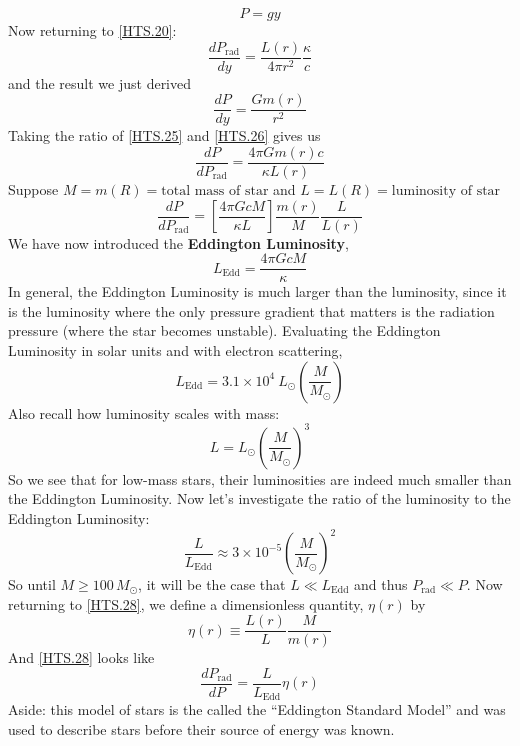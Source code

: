 \documentclass[10pt]{article}
\numberwithin{equation}{section}
\begin{document}
	\begin{equation}
		\label{HTS.24} \boxed{P=gy}
	\end{equation}
	Now returning to \eqref{HTS.20}:
	\begin{equation}
		\label{HTS.25} \frac{dP_{\mathrm{rad}}}{dy}=\frac{L(r)}{4\pi r^2}\frac{\kappa}{c}
	\end{equation}
	and the result we just derived
	\begin{equation}
		\label{HTS.26} \frac{dP}{dy}=\frac{Gm(r)}{r^2}
	\end{equation}
	Taking the ratio of \eqref{HTS.25} and \eqref{HTS.26} gives us
	\begin{equation}
		\label{HTS.27} \frac{dP}{dP_{\mathrm{rad}}}=\frac{4\pi Gm(r)c}{\kappa L(r)}
	\end{equation}
	Suppose $M=m(R)=\textrm{total mass of star}$ and $L=L(R)=\textrm{luminosity of star}$
	\begin{equation}
		\label{HTS.28} \frac{dP}{dP_{\mathrm{rad}}}=\left[\frac{4\pi GcM}{\kappa L}\right]\frac{m(r)}{M}\frac{L}{L(r)}
	\end{equation}
	We have now introduced the \textbf{Eddington Luminosity}, 
	\begin{equation}
		\label{HTS.29} L_{\mathrm{Edd}}=\frac{4\pi GcM}{\kappa}
	\end{equation}
	In general, the Eddington Luminosity is much larger than the luminosity, since it is the luminosity where the only pressure gradient that matters is the radiation pressure (where the star becomes unstable). Evaluating the Eddington Luminosity in solar units and with electron scattering,
	\begin{equation}
		\label{HTS.30} L_{\mathrm{Edd}}=3.1\times 10^4\ L_{\odot}\left(\frac{M}{M_\odot}\right)
	\end{equation}
	Also recall how luminosity scales with mass:
	\begin{equation}
		\label{HTS.31} L=L_\odot\left(\frac{M}{M_\odot}\right)^3
	\end{equation}
	So we see that for low-mass stars, their luminosities are indeed much smaller than the Eddington Luminosity. Now let's investigate the ratio of the luminosity to the Eddington Luminosity:
	\begin{equation}
		\label{HTS.32} \frac{L}{L_{\mathrm{Edd}}}\approx 3\times 10^{-5}\left(\frac{M}{M_\odot}\right)^2
	\end{equation}
	So until $M\geq 100\,M_\odot$, it will be the case that $L\ll L_{\mathrm{Edd}}$ and thus $P_{\mathrm{rad}}\ll P$. Now returning to \eqref{HTS.28}, we define a dimensionless quantity, $\eta(r)$ by
	\begin{equation}
		\label{HTS.33} \eta(r)\equiv \frac{L(r)}{L}\frac{M}{m(r)}
	\end{equation}
	And \eqref{HTS.28} looks like
	\begin{equation}
		\label{HTS.34} \frac{dP_{\mathrm{rad}}}{dP}=\frac{L}{L_{\mathrm{Edd}}}\eta(r)
	\end{equation}
	Aside: this model of stars is the called the ``Eddington Standard Model'' and was used to describe stars before their source of energy was known. 
\end{document}
